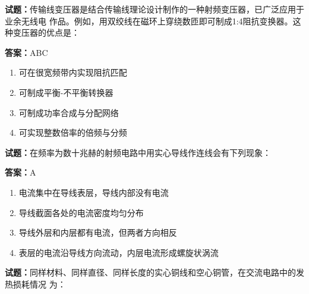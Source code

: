 \documentclass{ctexbook}
\begin{document}




\vspace{1em}

\textbf{试题：}传输线变压器是结合传输线理论设计制作的一种射频变压器，已广泛应用于业余无线电
作品。例如，用双绞线在磁环上穿绕数匝即可制成1:4阻抗变换器。这种变压器的优点是： 

\textbf{答案：}ABC 

\begin{enumerate}[leftmargin=3em]
  \item 可在很宽频带内实现阻抗匹配 


  \item 可制成平衡-不平衡转换器 

  \item 可制成功率合成与分配网络 

  \item 可实现整数倍率的倍频与分频 

\end{enumerate}





\vspace{1em}

\textbf{试题：}在频率为数十兆赫的射频电路中用实心导线作连线会有下列现象： 

\textbf{答案：}A 

\begin{enumerate}[leftmargin=3em]
  \item 电流集中在导线表层，导线内部没有电流 

  \item 导线截面各处的电流密度均匀分布 

  \item 导线外层和内层都有电流，但两者方向相反 

  \item 表层的电流沿导线方向流动，内层电流形成螺旋状涡流 

\end{enumerate}





\vspace{1em}

\textbf{试题：}同样材料、同样直径、同样长度的实心铜线和空心铜管，在交流电路中的发热损耗情况
为： 
\end{document}
